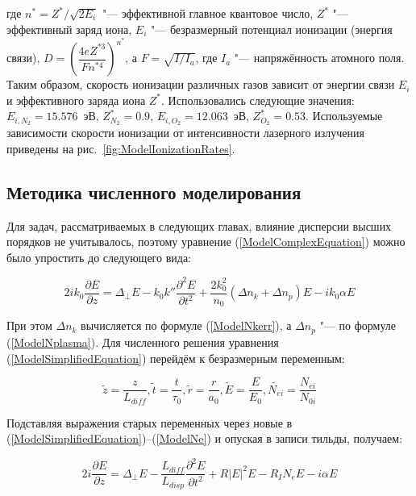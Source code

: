 \noindent где $n^{*} = Z^{*}/\sqrt{2 E_i}$ "--- эффективной главное квантовое число, $Z^{*}$ "--- эффективный заряд иона, $E_i$ "--- безразмерный потенциал ионизации (энергия связи),
$D = \left( \dfrac{4 e Z^{*3}}{F n^{*4}} \right)^{n^{*}}$, а $F = \sqrt{I/I_a}$, где $I_a$ "--- напряжённость атомного поля. Таким образом,
скорость ионизации различных газов зависит от энергии связи $E_i$ и эффективного заряда иона $Z^{*}$. Использовались следующие значения:
$E_{i,N_2} = 15.576$~эВ, $Z^{*}_{N_2} = 0.9$, $E_{i,O_2} = 12.063$~эВ, $Z^{*}_{O_2} = 0.53$.
Используемые зависимости скорости ионизации от интенсивности лазерного излучения приведены на рис.~\ref{fig:ModelIonizationRates}.


\subsection{Методика численного моделирования}

Для задач, рассматриваемых в следующих главах, влияние дисперсии высших порядков не учитывалось,
поэтому уравнение (\ref{ModelComplexEquation}) можно было упростить до следующего вида:

\begin{equation}\label{ModelSimplifiedEquation}
2 i k_0 \dfrac{\partial E}{\partial z} = \Delta_{\perp}E - k_0 k'' \dfrac{\partial^2 E}{\partial t^2}
+ \dfrac{2 k_0^2}{n_0}\left(\Delta n_k + \Delta n_p\right)E - i k_0 \alpha E
\end{equation}

При этом $\Delta n_k$ вычисляется по формуле (\ref{ModelNkerr}), а $\Delta n_p$ "--- по формуле (\ref{ModelNplasma}).
Для численного решения уравнения (\ref{ModelSimplifiedEquation}) перейдём к безразмерным переменным:

\begin{equation}
\tilde{z} = \frac{z}{L_{diff}}, \tilde{t} = \frac{t}{\tau_0}, \tilde{r} = \frac{r}{a_0}, \tilde{E} = \frac{E}{E_0}, \tilde{N_{ei}} = \frac{N_{ei}}{N_{0i}}
\end{equation}

Подставляя выражения старых переменных через новые в (\ref{ModelSimplifiedEquation})--(\ref{ModelNe}) и опуская в записи тильды, получаем:

\begin{equation}\label{ModelNodim}
2 i \dfrac{\partial E}{\partial z} = \Delta_{\perp}E - \dfrac{L_{diff}}{L_{disp}} \dfrac{\partial^2 E}{\partial t^2} + R |E|^2 E - R_{I} N_{e} E - i \alpha E
\end{equation}

